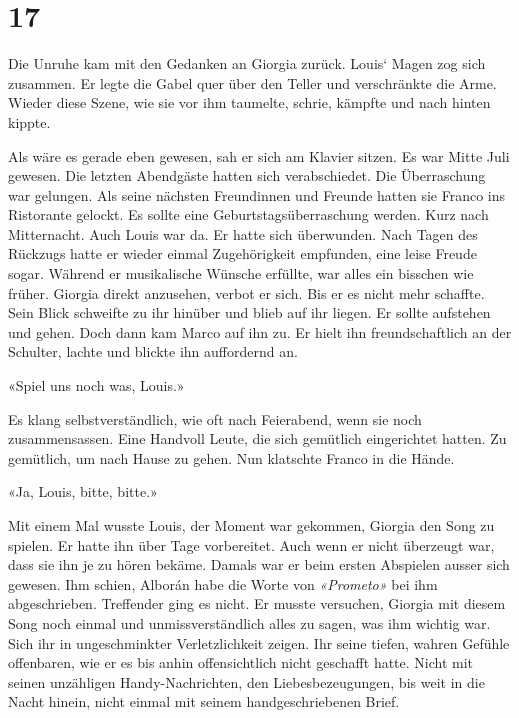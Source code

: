 \chapter{17}



Die Unruhe kam mit den Gedanken an Giorgia zurück. Louis` Magen zog sich zusammen. Er legte die Gabel quer über den Teller und verschränkte die Arme. Wieder diese Szene, wie sie vor ihm taumelte, schrie, kämpfte und nach hinten kippte.

Als wäre es gerade eben gewesen, sah er sich am Klavier sitzen. 
Es war Mitte Juli gewesen. Die letzten Abendgäste hatten sich verabschiedet. Die
Überraschung war gelungen. Als seine nächsten Freundinnen und Freunde hatten sie Franco ins Ristorante gelockt. Es sollte eine Geburtstagsüberraschung werden. Kurz nach
Mitternacht. Auch Louis war da. Er hatte sich überwunden. Nach Tagen des
Rückzugs hatte er wieder einmal Zugehörigkeit empfunden, eine leise
Freude sogar. Während er musikalische Wünsche erfüllte, war alles ein
bisschen wie früher. Giorgia direkt anzusehen, verbot er sich. Bis er es nicht mehr schaffte. Sein Blick schweifte zu ihr hinüber und
blieb auf ihr liegen. Er sollte aufstehen und gehen.
Doch dann kam Marco auf ihn zu. Er hielt ihn freundschaftlich an der
Schulter, lachte und blickte ihn auffordernd an.

«Spiel uns noch was, Louis.»

Es klang selbstverständlich, wie oft nach Feierabend, wenn sie noch
zusammensassen. Eine Handvoll Leute, die sich gemütlich eingerichtet
hatten. Zu gemütlich, um nach Hause zu gehen.
Nun klatschte Franco in die Hände.

«Ja, Louis, bitte, bitte.»

Mit einem Mal wusste Louis, der Moment war gekommen, Giorgia den Song zu
spielen. Er hatte ihn über Tage vorbereitet. Auch wenn er nicht überzeugt war, dass sie ihn 
je zu hören bekäme. Damals war er beim ersten Abspielen ausser sich gewesen. Ihm schien,
Alborán habe die Worte von \emph{«Prometo»} bei ihm abgeschrieben.
Treffender ging es nicht.
Er musste versuchen, Giorgia mit diesem Song noch einmal und unmissverständlich alles zu sagen, was ihm wichtig war. Sich ihr in ungeschminkter Verletzlichkeit zeigen. Ihr seine tiefen, wahren Gefühle offenbaren, wie er es bis anhin offensichtlich nicht geschafft hatte. Nicht mit seinen unzähligen Handy-Nachrichten, den
Liebesbezeugungen, bis weit in die Nacht hinein, nicht einmal mit seinem
handgeschriebenen Brief.


